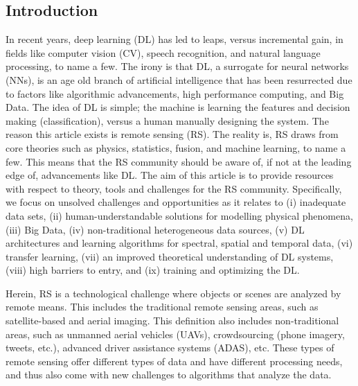 \documentclass[12pt]{spieman}
\newcommand{\ParSection}[1]{}
\begin{document}
%
%
\begin{spacing}{1}    %


%
%
\section{Introduction}
\label{sec:Introduction}

\ParSection{Motivation (DEREK-DONE)} In recent years, deep learning (DL) has led to leaps, versus incremental gain, in fields like computer vision (CV), speech recognition, and natural language processing, to name a few. The irony is that DL, a surrogate for neural networks (NNs), is an age old branch of artificial intelligence that has been resurrected due to factors like algorithmic advancements, high performance computing, and Big Data. The idea of DL is simple; the machine is learning the features and decision making (classification), versus a human manually designing the system. The reason this article exists is remote sensing (RS). The reality is, RS draws from core theories such as physics, statistics, fusion, and machine learning, to name a few. This means that the RS community should be aware of, if not at the leading edge of, advancements like DL. The aim of this article is to provide resources with respect to theory, tools and challenges for the RS community. Specifically, we focus on unsolved challenges and opportunities as it relates to (i) inadequate data sets, (ii) human-understandable solutions for modelling physical phenomena, (iii) Big Data, (iv) non-traditional heterogeneous data sources, (v) DL architectures and learning algorithms for spectral, spatial and temporal data, (vi) transfer learning, (vii) an improved theoretical understanding of DL systems, (viii) high barriers to entry, and (ix) training and optimizing the DL.

\ParSection{Define Remote Sensing (JOHN-DONE)} Herein, RS is a technological challenge where objects or scenes are analyzed by remote means. This includes the traditional remote sensing areas, such as satellite-based and aerial imaging. This definition also includes non-traditional areas, such as unmanned aerial vehicles (UAVs), crowdsourcing (phone imagery, tweets, etc.), advanced driver assistance systems (ADAS), etc. These types of remote sensing offer different types of data and have different processing needs, and thus also come with new challenges to algorithms that analyze the data.


\end{spacing}
\end{document}
